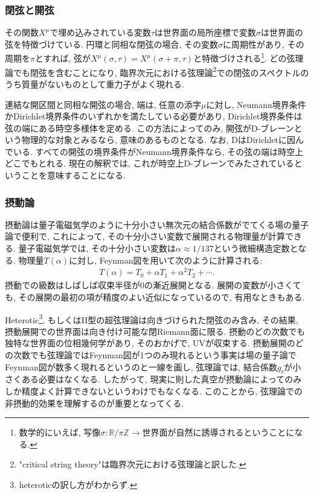 \documentclass[10pt,a4paper]{jsarticle}
\begin{document}
\subsubsection*{閉弦と開弦}
その関数$X^{\mu}$で埋め込みされている変数$\tau$は世界面の局所座標で変数$\sigma$は世界面の弦を特徴づけている. 円環と同相な閉弦の場合, その変数$\sigma$に周期性があり, その周期を$\pi$とすれば, 弦が$X^{\mu} \left( \sigma, \tau \right) = X^{\mu} \left( \sigma + \pi, \tau \right) $と特徴づけされる\footnote{数学的にいえば, 写像$\sigma : \mathbb{R} / \pi \mathbb{Z} \rightarrow \text{世界面}$が自然に誘導されるということになる. }. どの弦理論でも閉弦を含むことになり, 臨界次元における弦理論\footnote{"critical string theory"は臨界次元における弦理論と訳した. }での閉弦のスペクトルのうち質量がないものとして重力子がよく現れる. \par
連結な開区間と同相な開弦の場合, 端は, 任意の添字$\mu$に対し, Neumann境界条件かDirichlet境界条件のいずれかを満たしている必要があり, Dirichlet境界条件は弦の端にある時空多様体を定める. この方法によってのみ, 開弦がD-ブレーンという物理的な対象とみるなら, 意味のあるものとなる. なお, DはDirichletに因んでいる. すべての開弦の境界条件がNeumann境界条件なら, その弦の端は時空上どこでもとれる. 現在の解釈では, これが時空上D-ブレーンでみたされているということを意味することになる. 
\subsubsection*{摂動論}
摂動論は量子電磁気学のように十分小さい無次元の結合係数がでてくる場の量子論で便利で, これによって, その十分小さい変数で展開される物理量が計算できる. 量子電磁気学では, その十分小さい変数は$\alpha \approx 1 / 137$という微細構造定数となる. 物理量$T \left( \alpha \right) $に対し, Feynman図を用いて次のように計算される: 
\begin{align*}
    T \left( \alpha \right) = T_0 + \alpha T_1 + \alpha^2 T_2 + \cdots .
\end{align*}
摂動での級数はしばしば収束半径が0の漸近展開となる. 展開の変数が小さくても, その展開の最初の項が精度のよい近似になっているので, 有用なときもある. \par
Heterotic\footnote{heteroticの訳し方がわからず. }, もしくはII型の超弦理論は向きづけられた閉弦のみ含み, その結果, 摂動展開での世界面は向き付け可能な閉Riemann面に限る. 摂動のどの次数でも独特な世界面の位相幾何学があり, そのおかげで, UVが収束する. 摂動展開のどの次数でも弦理論ではFeynman図が1つのみ現れるという事実は場の量子論でFeynman図が数多く現れるというのと一線を画し, 弦理論では, 結合係数$g_{\mathrm{s}}$が小さくある必要はなくなる. したがって, 現実に則した真空が摂動論によってのみしか精度よく計算できないというわけでもなくなる. このことから, 弦理論での非摂動的効果を理解するのが重要となってくる. 
\end{document}

